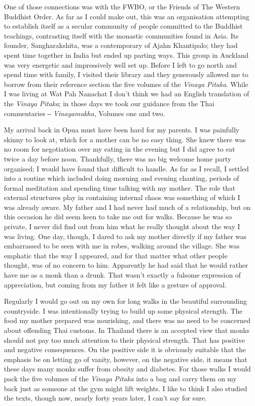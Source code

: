 One of those connections was with the FWBO, or the Friends of The
Western Buddhist Order. As far as I could make out, this was an
organisation attempting to establish itself as a secular community of
people committed to the Buddhist teachings, contrasting itself with the
monastic communities found in Asia. Its founder, Sangharakshita, was a
contemporary of Ajahn Khantipalo; they had spent time together in India
but ended up parting ways. This group in Auckland was very energetic and
impressively well set up. Before I left to go north and spend time with
family, I visited their library and they generously allowed me to borrow
from their reference section the five volumes of the \emph{Vinaya
Pitaka}. While I was living at Wat Pah Nanachat I don't think we had an
English translation of the \emph{Vinaya} \emph{Pitaka}; in those days we
took our guidance from the Thai commentaries ‒ \emph{Vinayamukha,}
Volumes one and two.

\enlargethispage{\baselineskip}

My arrival back in Opua must have been hard for my parents. I was
painfully skinny to look at, which for a mother can be no easy thing.
She knew there was no room for negotiation over my eating in the evening
but I did agree to eat twice a day before noon. Thankfully, there was no
big welcome home party organised; I would have found that difficult to
handle. As far as I recall, I settled into a routine which included
doing morning and evening chanting, periods of formal meditation and
spending time talking with my mother. The role that external structures
play in containing internal chaos was something of which I was already
aware. My father and I had never had much of a relationship, but on this
occasion he did seem keen to take me out for walks. Because he was so
private, I never did find out from him what he really thought about the
way I was living. One day, though, I dared to ask my mother directly if
my father was embarrassed to be seen with me in robes, walking around
the village. She was emphatic that the way I appeared, and for that
matter what other people thought, was of no concern to him. Apparently
he had said that he would rather have me as a monk than a drunk. That
wasn't exactly a fulsome expression of appreciation, but coming from my
father it felt like a gesture of approval.

\enlargethispage{\baselineskip}

Regularly I would go out on my own for long walks in the beautiful
surrounding countryside. I was intentionally trying to build up some
physical strength. The food my mother prepared was nourishing, and there
was no need to be concerned about offending Thai customs. In Thailand
there is an accepted view that monks should not pay too much attention
to their physical strength. That has positive and negative consequences.
On the positive side it is obviously suitable that the emphasis be on
letting go of vanity, however, on the negative side, it means that these
days many monks suffer from obesity and diabetes. For those walks I
would pack the five volumes of the \emph{Vinaya} \emph{Pitaka} into a
bag and carry them on my back just as someone at the gym might lift
weights. I like to think I also studied the texts, though now, nearly
forty years later, I can't say for sure.

